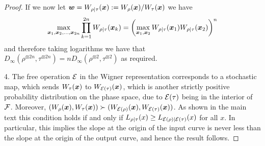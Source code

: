 \documentclass[pra,
aps,
twocolumn,
superscriptaddress,
groupedaddress,
nofootinbib,
reprint
]{revtex4-1}
\begin{document}
\begin{proof}
If we now let $\boldsymbol{w} = W_{\rho|\tau}(\boldsymbol{x}) := W_{\rho}(\boldsymbol{x}) /W_{\tau}(\boldsymbol{x})$ we have
\begin{equation}
\max_{\boldsymbol{x}_1, \boldsymbol{x}_2, \dots ,\boldsymbol{x}_{2n}} \prod_{k=1}^{2n} W_{\rho|\tau}(\boldsymbol{x}_k) = \left( \max_{\boldsymbol{x}_1, \boldsymbol{x}_2} W_{\rho|\tau}(\boldsymbol{x}_1)W_{\rho|\tau}(\boldsymbol{x}_2) \right)^n
\end{equation}
and therefore taking logarithms we have that $D_\infty (\rho^{\otimes 2n}, \tau^{\otimes 2n}) = n D_\infty(\rho^{\otimes 2} ,\tau^{\otimes 2})$ as required.

4. The free operation ${\mathcal E}$ in the Wigner representation corresponds to a stochastic map, which sends $W_\tau(\boldsymbol{x})$ to $W_{{\mathcal E}(\tau)}(\boldsymbol{x})$, which is another strictly positive probability distribution on the phase space, due to ${\mathcal E}(\tau)$ being in the interior of ${\mathcal F}$. Moreover, $(W_\rho(\boldsymbol{x}), W_\tau(\boldsymbol{x}) ) \succ (W_{{\mathcal E}(\rho)}(\boldsymbol{x}) , W_{{\mathcal E}(\tau)}(\boldsymbol{x}))$. As shown in the main text this condition holds if and only if $L_{\rho|\tau}(x) \ge L_{{\mathcal E}(\rho)|{\mathcal E}(\tau)}(x)$ for all $x$. In particular, this implies the slope at the origin of the input curve is never less than the slope at the origin of the output curve, and hence the result follows.
\end{proof}
\end{document}

